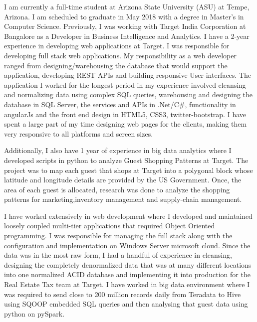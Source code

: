\documentclass[11pt, a4paper]{awesome-cv}
\begin{document}
\makecvheader

\makelettertitle

\begin{cvletter}
I am currently a full-time student at Arizona State University (ASU) at Tempe, Arizona. I am scheduled to graduate in May 2018 with a degree in Master’s in Computer Science. Previously, I was working with Target India Corporation at Bangalore as a Developer in Business Intelligence and Analytics. I have a 2-year experience in developing web applications at Target. I was responsible for developing full stack web applications.
My responsibility as a web developer ranged from designing/warehousing the database that would support the application, developing REST APIs and building responsive User-interfaces. The application I worked for the longest period in my experience involved cleansing and normalizing data using complex SQL queries, warehousing and designing the database in SQL Server, the services and APIs in .Net/C#, functionality in angularJs and the front end design in HTML5, CSS3, twitter-bootstrap. I have spent a large part of my time designing web pages for the clients, making them very responsive to all platforms and screen sizes. 

Additionally,  I also have 1 year of experience in big data analytics where I developed scripts in python to analyze Guest Shopping Patterns at Target. The project was to map each guest that shops at Target into a polygonal block whose latitude and longitude details are provided by the US Government. 
Once, the area of each guest is allocated, research was done to analyze the shopping patterns for marketing,inventory management and supply-chain management.

I have worked extensively in web development where I developed and maintained loosely coupled multi-tier applications that required Object Oriented programming. I was responsible for managing the full stack along with the configuration  and implementation on Windows Server microsoft cloud. Since the data was in the most raw form, I had a handful of experience in cleansing, designing the completely denormalized data that was at many different locations into one normalized ACID database and implementing it into production for the Real Estate Tax team at Target. 
I have worked in big data environment where I was required to send close to 200 million records daily from Teradata to Hive using SQOOP embedded SQL queries and then analysing that guest data using python on pySpark.

\end{cvletter}

\makeletterclosing
\end{document}

